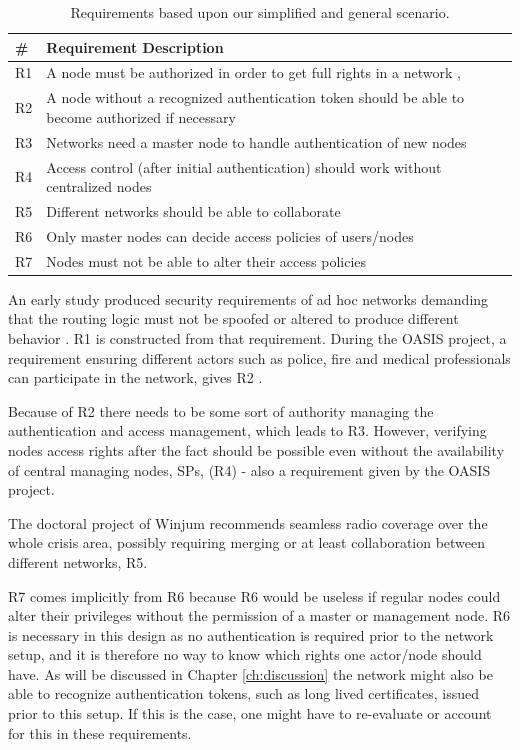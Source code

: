 \begin{table}[ht!]
	\centering
	\begin{tabular*}{\textwidth}{ | p{5mm} | p{388pt} | }
	\hline
	\textbf{\#} & \textbf{Requirement Description}\\\hline
		R1 & A node must be authorized in order to get full rights in a network \cite{dahill2001secure}, \cite{sanzgiri2002secure}\\\hline
		R2 & A node without a recognized authentication token should be able to become authorized if necessary\\\hline
		R3 & Networks need a master node to handle authentication of new nodes\\\hline
		R4 & Access control (after initial authentication) should work without centralized nodes\\\hline
		R5 & Different networks should be able to collaborate \cite{ffi_2005_04015}\\\hline
		R6 & Only master nodes can decide access policies of users/nodes\\\hline
		R7 & Nodes must not be able to alter their access policies\\\hline
	\end{tabular*}
	\caption{Requirements based upon our simplified and general scenario.}
	\label{tab:our_req}
\end{table}

An early study produced security requirements of ad hoc networks demanding
that the routing logic must not be spoofed or altered to produce different
behavior \cite{dahill2001secure}. R1 is constructed from that requirement.
During the OASIS project, a requirement ensuring different actors such as
police, fire and medical professionals can participate in the network, gives R2
\cite{5683058}.

Because of R2 there needs to be some sort of authority managing the
authentication and access management, which leads to R3. However, verifying
nodes access rights after the fact should be possible even without the
availability of central managing nodes, SPs, (R4) - also a requirement given by
the OASIS project.

The doctoral project of Winjum recommends seamless radio coverage over the whole
crisis area, possibly requiring merging or at least collaboration between
different networks, R5.

R7 comes implicitly from R6 because R6 would be useless if regular nodes could
alter their privileges without the permission of a master or management node. R6
is necessary in this design as no authentication is required prior to the
network setup, and it is therefore no way to know which rights one actor/node
should have. As will be discussed in Chapter \ref{ch:discussion} the network
might also be able to recognize authentication tokens, such as long lived
certificates, issued prior to this setup. If this is the case, one might have to
re-evaluate or account for this in these requirements.

